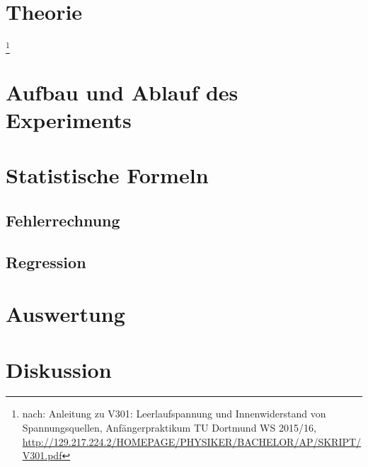 \documentclass[a4,12pt]{article}
\begin{document}



\tableofcontents
\newpage


\section{Theorie}
\footnote{nach: Anleitung zu V301: Leerlaufspannung und Innenwiderstand von Spannungsquellen, Anfängerpraktikum TU Dortmund WS 2015/16, \url{http://129.217.224.2/HOMEPAGE/PHYSIKER/BACHELOR/AP/SKRIPT/V301.pdf}}

\newpage


\section{Aufbau und Ablauf des Experiments}

\clearpage

\section{Statistische Formeln}
\subsection{Fehlerrechnung}
\label{sec:Fehlerrechnung}

\subsection{Regression}
\label{sec:regression}


\section{Auswertung}

\newpage


\section{Diskussion}

%
%
\end{document}
